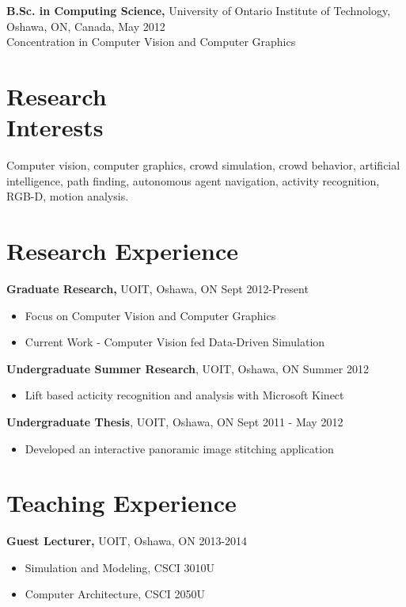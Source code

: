 \documentclass[margin]{res}
\begin{document}
\begin{resume}
{\bf B.Sc. in Computing Science,} University of Ontario Institute of Technology, \\
Oshawa, ON, Canada, May 2012 \\
Concentration in Computer Vision and Computer Graphics

\section{Research\\ Interests}
Computer vision, computer graphics, crowd simulation, crowd behavior, artificial intelligence, path finding, autonomous agent navigation,  activity recognition, RGB-D, motion analysis.
 
\section{Research Experience}
 {\bf Graduate Research,} UOIT, Oshawa, ON \hfill Sept 2012-Present
 \begin{itemize} \itemsep -2pt  %
 \item Focus on Computer Vision and Computer Graphics
 \item Current Work - Computer Vision fed Data-Driven Simulation
 \end{itemize}

{\bf Undergraduate Summer Research}, UOIT, Oshawa, ON \hfill Summer 2012
\begin{itemize} \itemsep -2pt
\item Lift based acticity recognition and analysis with Microsoft Kinect
\end{itemize}

{\bf Undergraduate Thesis}, UOIT, Oshawa, ON \hfill Sept 2011 - May 2012
\begin{itemize} \itemsep -2pt
\item Developed an interactive panoramic image stitching application
\end{itemize}

\section{Teaching Experience} 
               {\bf Guest Lecturer,} UOIT, Oshawa, ON    \hfill         2013-2014 
                \begin{itemize} \itemsep -2pt
              \item Simulation and Modeling, CSCI 3010U
              \item  Computer Architecture, CSCI 2050U
              \end{itemize}


\end{resume}
\end{document}
